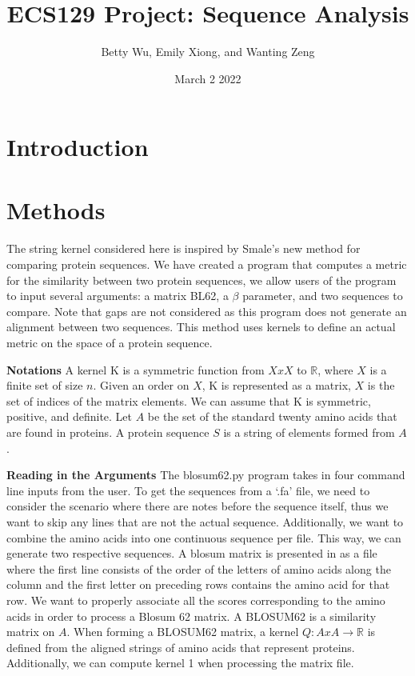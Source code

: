 \documentclass{article}
\title{ECS129 Project: Sequence Analysis}
\author{Betty Wu, Emily Xiong, and Wanting Zeng  }
\date{March 2 2022}
\begin{document}
\maketitle

\section{Introduction}

\section{Methods}

\paragraph{}
The string kernel considered here is inspired by Smale’s new method for comparing protein sequences. We have created a program that computes a metric for the similarity between two protein sequences, we allow users of the program to input several arguments: a matrix BL62, a $\beta$ parameter, and two sequences to compare. Note that gaps are not considered as this program does not generate an alignment between two sequences. This method uses kernels to define an actual metric on the space of a protein sequence. 

\textbf{Notations}
A kernel K is a symmetric function from $X x X$ to $\mathbb{R}$, where $X$ is a finite set of size $n$. Given an order on $X$, K is represented as a matrix, $X$ is the set of indices of the matrix elements. We can assume that K is symmetric, positive, and definite. Let $A$ be the set of the standard twenty amino acids that are found in proteins. A protein sequence $S$ is a string of elements formed from $A$.

\textbf{Reading in the Arguments}
The blosum62.py program takes in four command line inputs from the user. To get the sequences from a ‘.fa’ file, we need to consider the scenario where there are notes before the sequence itself, thus we want to skip any lines that are not the actual sequence. Additionally, we want to combine the amino acids into one continuous sequence per file. This way, we can generate two respective sequences. 
A blosum matrix is presented in as a file where the first line consists of the order of the letters of amino acids along the column and the first letter on preceding rows contains the amino acid for that row. We want to properly associate all the scores corresponding to the amino acids in order to process a Blosum 62 matrix. A BLOSUM62 is a similarity matrix on $A$. When forming a BLOSUM62 matrix, a kernel $Q \colon A x A \to \mathbb{R}$ is defined from the aligned strings of amino acids that represent proteins. Additionally, we can compute kernel 1 when processing the matrix file. 
\end{document}
